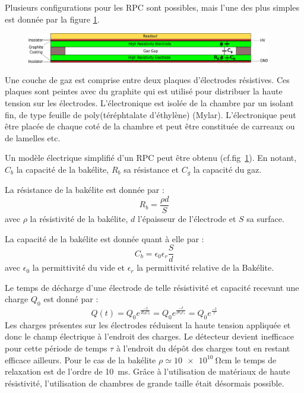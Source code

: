 Plusieurs configurations pour les RPC sont possibles, mais l'une des plus simples est donnée par la figure \ref{RPCscheme}.

\begin{figure}[th!]
	\centering
	\includegraphics[width=0.95\textwidth]{RPC/scheme_first.png}
	\label{RPCscheme}
\end{figure}
\vspace{-0.1cm}
Une couche de gaz est comprise entre deux plaques d'électrodes résistives. Ces plaques sont peintes avec du graphite qui est utilisé pour distribuer la haute tension sur les électrodes. L'électronique est isolée de la chambre par un isolant fin, de type feuille de poly(téréphtalate d'éthylène) (Mylar). L'électronique peut être placée de chaque coté de la chambre et peut être constituée de carreaux ou de lamelles etc.

Un modèle électrique simplifié d'un RPC peut être obtenu (cf.fig~\ref{RPCscheme}). En notant, $C_{b}$ la capacité de la bakélite, $R_{b}$ sa résistance et $C_{g}$ la capacité du gaz.

La résistance de la bakélite est donnée par :
\begin{equation}
R_b=\frac{\rho d}{S}
\end{equation}
avec $\rho$ la résistivité de la bakélite, $d$ l'épaisseur de l'électrode et $S$ sa surface.

La capacité de la bakélite est donnée quant à elle par :
\begin{equation}
C_{b}=\epsilon_0\epsilon_r\frac{S}{d}
\end{equation} 
avec $\epsilon_0$ la permittivité du vide et $\epsilon_r$ la permittivité relative de la Bakélite.

Le temps de décharge d'une électrode de telle résistivité et capacité recevant une charge $Q_{0}$ est donné par :
\begin{equation}
Q(t)=Q_{0}e^{\frac{-t}{R_bC_b}}=Q_{0}e^{\frac{-t}{\rho\epsilon_{0}\epsilon_{r}}}=Q_{0}e^{\frac{-t}{\tau}}
\end{equation}
Les charges présentes sur les électrodes réduisent la haute tension appliquée et donc le champ électrique à l'endroit des charges. Le détecteur devient inefficace pour cette période de temps $\tau$ à l'endroit du dépôt des charges tout en restant efficace ailleurs. Pour le cas de la bakélite $\rho\simeq\SI{10e10}{\ohm\centi\meter}$ le temps de relaxation est de l'ordre de \SI{10}{\milli\second}. Grâce à l'utilisation de matériaux de haute résistivité, l'utilisation de chambres de grande taille était désormais possible.


